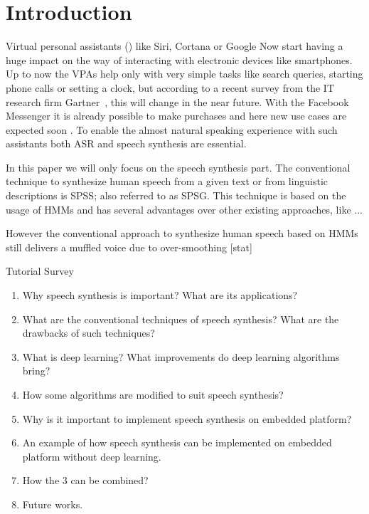 
\section{Introduction}

Virtual personal assistants () like Siri, Cortana or Google Now start having a huge impact on the way of interacting with electronic devices like smartphones. Up to now the \acp{VPA} help only with very simple tasks like search queries, starting phone calls or setting a clock, but according to a recent survey from the IT research firm Gartner~\cite{gartner:assistants}, this will change in the near future. With the Facebook Messenger it is already possible to make purchases and here new use cases are expected soon \cite{gartner:assistants}. To enable the almost natural speaking experience with such assistants both \ac{ASR} and speech synthesis are essential.

In this paper we will only focus on the speech synthesis part. The conventional technique to synthesize human speech from a given text or from linguistic descriptions is \ac{SPSS}; also referred to as \ac{SPSG}. This technique is based on the usage of \acp{HMM} and has several advantages over other existing approaches, like ...

However the conventional approach to synthesize human speech based on \acp{HMM} still delivers a muffled voice due to over-smoothing [stat]

Tutorial Survey\cite{li:survey}

\vspace{3em}

\begin{enumerate}
	\item Why speech synthesis is important? What are its applications?
	\item What are the conventional techniques of speech synthesis? What are the drawbacks of such techniques?
	\item What is deep learning? What improvements do deep learning algorithms bring?
	\item How some algorithms are modified to suit speech synthesis?
	\item Why is it important to implement speech synthesis on embedded platform?
	\item An example of how speech synthesis can be implemented on embedded platform without deep learning.
	\item How the 3 can be combined?
	\item Future works.
\end{enumerate}


